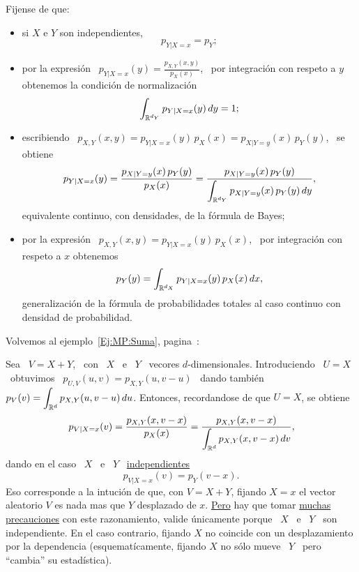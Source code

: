 {Fijense de  que:
%
\begin{itemize}
\item si $X$ e $Y$ son independientes,
  \[
  p_{Y|X=x} = p_Y;
  \]
%
\item por  la expresi\'on \ $p_{Y|X=x}(y) =  \frac{p_{X,Y}(x,y)}{p_X(x)}$, \ por
  integraci\'on con respeto a $y$ obtenemos la condici\'on de normalizaci\'on
  \[
  \int_{\mathbb{R}^{d_Y}} p_{Y|X=x}(y) \, dy = 1;
  \]
%
\item escribiendo  \ $p_{X,Y}(x,y)  = p_{Y|X=x}(y) \,  p_X(x) =  p_{X|Y=y}(x) \,
  p_Y(y)$, \ se obtiene
  \[
  p_{Y|X=x}(y)   =  \frac{p_{X|Y=y}(x) \,   p_Y(y)}{p_X(x)}   =  \frac{p_{X|Y=y}(x)
    \, p_Y(y)}{\displaystyle \int_{\mathbb{R}^{d_Y}} p_{X|Y=y}(x) \, p_Y(y) \, dy},
  \]
  equivalente continuo, con densidades, de la f\'ormula de Bayes;
%
\item  por la  expresi\'on  \ $p_{X,Y}(x,y)  =  p_{Y|X=x}(y) \,  p_X(x)$, \  por
  integraci\'on con respeto a $x$ obtenemos
  \[
  p_Y(y) = \int_{\mathbb{R}^{d_X}} p_{Y|X=x}(y) \, p_X(x) \, dx,
  \]
  generalizaci\'on de la f\'ormula de  probabilidades totales al caso continuo con
  densidad de probabilidad.
\end{itemize}

Volvemos al ejemplo~\ref{Ej:MP:Suma}, pagina~\pageref{Ej:MP:Suma}:
\begin{ejemplo}\label{Ej:MP:SumaCond}
  Sea   \   $V  =   X   +   Y$,  \   con   \   $X$  \   e   \   $Y$  \   vecores
  $d$-dimensionales.  Introduciendo \  $U =  X$  \ obtuvimos  \ $p_{U,V}(u,v)  =
  p_{X,Y}(u,v-u)$  \ dando  tambi\'en \  $\displaystyle p_V(v)  = \int_{\mathbb{R}^d}
  p_{X,Y}(u,v-u) \, du$. Entonces, recordandose de que $U = X$, se obtiene
  \[
  p_{V|X=x}(v)            =            \frac{p_{X,Y}(x,v-x)}{p_X(x)}           =
  \frac{p_{X,Y}(x,v-x)}{\displaystyle \int_{\mathbb{R}^d} p_{X,Y}(x,v-x) \, dv},
  \]
  dando en el caso \ $X$ \ e \ $Y$ \ \underline{independientes}
  \[
  p_{V|X=x}(v) = p_Y(v-x).
  \]
  Eso corresponde a  la intuci\'on de que, con $V  = X + Y$, fijando  $X = x$ el
  vector aleatorio $V$  es nada mas que $Y$  desplazado de $x$. \underline{Pero}
  hay que  tomar \underline{muchas  precauciones} con este  razonamiento, valide
  \'unicamente  porque  \ $X$  \  e  \ $Y$  \  son  independiente.   En el  caso
  contrario, fijando  $X$ no coincide  con un desplazamiento por  la dependencia
  (esquemat\'icamente, fijando  $X$ no s\'olo mueve  \ $Y$ \  pero ``cambia'' su
  estad\'istica).
\end{ejemplo}

  }


